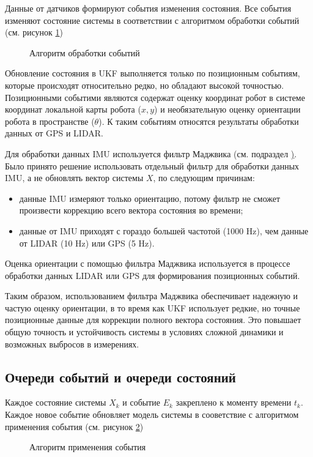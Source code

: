 Данные от датчиков формируют события изменения состояния. 
Все события изменяют состояние системы в соответствии с алгоритмом обработки событий (см. рисунок \ref{fig:handle_kf_event})

\FloatBarrier
\begin{figure}[H]
\centering
\caption{Алгоритм обработки событий}
\label{fig:handle_kf_event}
\end{figure}


Обновление состояния в UKF выполняется только по позиционным событиям, 
которые происходят относительно редко, но обладают высокой точностью.
Позиционными событими являются содержат оценку координат робот в системе координат локальной карты робота ($x, y$) и
необязательную оценку ориентации робота в пространстве ($\theta$).
К таким событиям относятся результаты обработки данных от GPS и LIDAR.

Для обработки данных IMU используется фильтр Маджвика (см. подраздел \href{sec:ahrs}). Было принято решение использовать
отдельный фильтр для обработки данных IMU, а не обновлять вектор системы ${X}$,
по следующим причинам:
\begin{itemize}
	\item данные IMU измеряют только ориентацию, потому фильтр не сможет произвести коррекцию
	      всего вектора состояния во времени;
        \item данные от IMU приходят с гораздо большей частотой (1000 Hz), чем данные от LIDAR (10 Hz) или GPS (5 Hz).
\end{itemize}

Оценка ориентации с помощью фильтра Маджвика используется 
в процессе обработки данных LIDAR или GPS для формирования позиционных событий.

Таким образом, использованием фильтра Маджвика обеспечивает надежную и частую оценку ориентации, в то время как UKF использует редкие, но точные позиционные данные для коррекции полного вектора состояния.
Это повышает общую точность и устойчивость системы в условиях сложной динамики и возможных выбросов в измерениях.

\subsection{Очереди событий и очереди состояний}
\label{subsec:queues}

Каждое состояние системы ${X}_k$ и событие ${E}_k$ 
закреплено к моменту времени $t_k$. Каждое новое событие 
обновляет модель системы в сооветствие с алгоритмом применения события (см. рисунок \ref{fig:apply_kf_event})
\FloatBarrier
\begin{figure}[H]
\centering
\caption{Алгоритм применения события}
\label{fig:apply_kf_event}
\end{figure}

